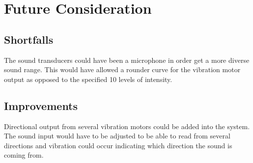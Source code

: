 \documentclass{article}
\begin{document}
\section{Future Consideration}
\subsection{Shortfalls}
The sound transducers could have been a microphone in order get a more diverse sound range.  This would have allowed a rounder curve for the vibration motor output as opposed to the specified 10 levels of intensity.

\subsection{Improvements}
Directional output from several vibration motors could be added into the system.  The sound input would have to be adjusted to be able to read from several directions and vibration could occur indicating which direction the sound is coming from.
\end{document}
